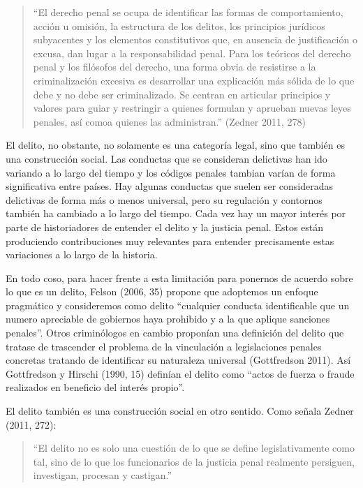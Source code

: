 \documentclass[
  spanish,
  letterpaper,
  DIV=11,
  numbers=noendperiod]{scrreprt}
\begin{document}
\begin{quote}
``El derecho penal se ocupa de identificar las formas de comportamiento,
acción u omisión, la estructura de los delitos, los principios jurídicos
subyacentes y los elementos constitutivos que, en ausencia de
justificación o excusa, dan lugar a la responsabilidad penal. Para los
teóricos del derecho penal y los filósofos del derecho, una forma obvia
de resistirse a la criminalización excesiva es desarrollar una
explicación más sólida de lo que debe y no debe ser criminalizado. Se
centran en articular principios y valores para guiar y restringir a
quienes formulan y aprueban nuevas leyes penales, así comoa quienes las
administran.'' (Zedner 2011, 278)
\end{quote}

El delito, no obstante, no solamente es una categoría legal, sino que
también es una construcción social. Las conductas que se consideran
delictivas han ido variando a lo largo del tiempo y los códigos penales
tambian varían de forma significativa entre países. Hay algunas
conductas que suelen ser consideradas delictivas de forma más o menos
universal, pero su regulación y contornos también ha cambiado a lo largo
del tiempo. Cada vez hay un mayor interés por parte de historiadores de
entender el delito y la justicia penal. Estos están produciendo
contribuciones muy relevantes para entender precisamente estas
variaciones a lo largo de la historia.

En todo coso, para hacer frente a esta limitación para ponernos de
acuerdo sobre lo que es un delito, Felson (2006, 35) propone que
adoptemos un enfoque pragmático y consideremos como delito ``cualquier
conducta identificable que un numero apreciable de gobiernos haya
prohibido y a la que aplique sanciones penales''. Otros criminólogos en
cambio proponían una definición del delito que tratase de trascender el
problema de la vinculación a legislaciones penales concretas tratando de
identificar su naturaleza universal (Gottfredson 2011). Así Gottfredson
y Hirschi (1990, 15) definían el delito como ``actos de fuerza o fraude
realizados en beneficio del interés propio''.

El delito también es una construcción social en otro sentido. Como
señala Zedner (2011, 272):

\begin{quote}
``El delito no es solo una cuestión de lo que se define legislativamente
como tal, sino de lo que los funcionarios de la justicia penal realmente
persiguen, investigan, procesan y castigan.''
\end{quote}
\end{document}
